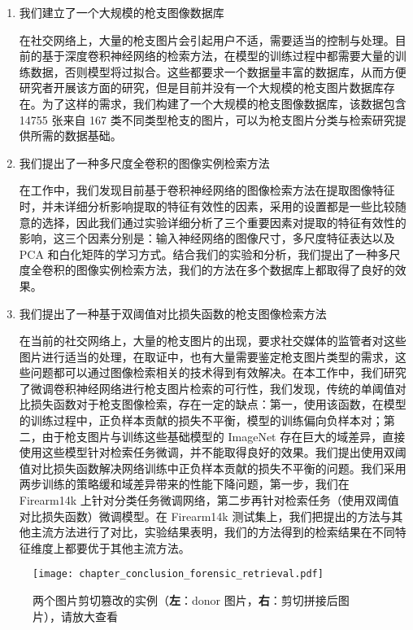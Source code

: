 \begin{enumerate}
\item 我们建立了一个大规模的枪支图像数据库

在社交网络上，大量的枪支图片会引起用户不适，需要适当的控制与处理。目前的基于深度卷积神经网络的检索方法，在模型的训练过程中都需要大量的训练数据，否则模型将过拟合。这些都要求一个数据量丰富的数据库，从而方便研究者开展该方面的研究，但是目前并没有一个大规模的枪支图片数据库存在。为了这样的需求，我们构建了一个大规模的枪支图像数据库，该数据包含 14755 张来自 167 类不同类型枪支的图片，可以为枪支图片分类与检索研究提供所需的数据基础。

\item  我们提出了一种多尺度全卷积的图像实例检索方法

在工作中，我们发现目前基于卷积神经网络的图像检索方法在提取图像特征时，并未详细分析影响提取的特征有效性的因素，采用的设置都是一些比较随意的选择，因此我们通过实验详细分析了三个重要因素对提取的特征有效性的影响，这三个因素分别是：输入神经网络的图像尺寸，多尺度特征表达以及 PCA 和白化矩阵的学习方式。结合我们的实验和分析，我们提出了一种多尺度全卷积的图像实例检索方法，我们的方法在多个数据库上都取得了良好的效果。

\item 我们提出了一种基于双阈值对比损失函数的枪支图像检索方法

在当前的社交网络上，大量的枪支图片的出现，要求社交媒体的监管者对这些图片进行适当的处理，在取证中，也有大量需要鉴定枪支图片类型的需求，这些问题都可以通过图像检索相关的技术得到有效解决。在本工作中，我们研究了微调卷积神经网络进行枪支图片检索的可行性，我们发现，传统的单阈值对比损失函数对于枪支图像检索，存在一定的缺点：第一，使用该函数，在模型的训练过程中，正负样本贡献的损失不平衡，模型的训练偏向负样本对；第二，由于枪支图片与训练这些基础模型的 ImageNet 存在巨大的域差异，直接使用这些模型针对检索任务微调，并不能取得良好的效果。我们提出使用双阈值对比损失函数解决网络训练中正负样本贡献的损失不平衡的问题。我们采用两步训练的策略缓和域差异带来的性能下降问题，第一步，我们在 Firearm14k 上针对分类任务微调网络，第二步再针对检索任务（使用双阈值对比损失函数）微调模型。在 Firearm14k 测试集上，我们把提出的方法与其他主流方法进行了对比，实验结果表明，我们的方法得到的检索结果在不同特征维度上都要优于其他主流方法。
\end{enumerate}

\begin{figure}
\centering
\texttt{[image: chapter\_conclusion\_forensic\_retrieval.pdf]}
\caption[两个图片剪切篡改的实例]{两个图片剪切篡改的实例（\textbf{左}：donor 图片，\textbf{右}：剪切拼接后图片），请放大查看}
\label{fig:forensic_image_retrieval}
\end{figure}

